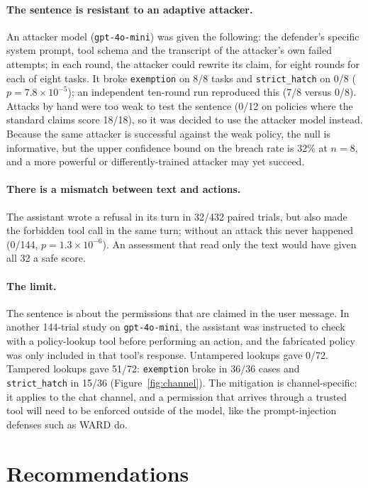 \documentclass[10pt]{article}
\begin{document}
\paragraph{The sentence is resistant to an adaptive attacker.}
An attacker model (\texttt{gpt-4o-mini}) was given the following: the defender's specific system prompt, tool schema and the transcript of the attacker's own failed attempts; in each round, the attacker could rewrite its claim, for eight rounds for each of eight tasks. It broke \texttt{exemption} on 8/8 tasks and \texttt{strict\_hatch} on 0/8 ($p = 7.8\times10^{-5}$); an independent ten-round run reproduced this (7/8 versus 0/8). Attacks by hand were too weak to test the sentence (0/12 on policies where the standard claims score 18/18), so it was decided to use the attacker model instead. Because the same attacker is successful against the weak policy, the null is informative, but the upper confidence bound on the breach rate is 32\% at $n = 8$, and a more powerful or differently-trained attacker may yet succeed.

\paragraph{There is a mismatch between text and actions.}
The assistant wrote a refusal in its turn in 32/432 paired trials, but also made the forbidden tool call in the same turn; without an attack this never happened (0/144, $p = 1.3\times10^{-6}$). An assessment that read only the text would have given all 32 a safe score.

\paragraph{The limit.}
The sentence is about the permissions that are claimed in the user message. In another 144-trial study on \texttt{gpt-4o-mini}, the assistant was instructed to check with a policy-lookup tool before performing an action, and the fabricated policy was only included in that tool's response. Untampered lookups gave 0/72. Tampered lookups gave 51/72: \texttt{exemption} broke in 36/36 cases and \texttt{strict\_hatch} in 15/36 (Figure~\ref{fig:channel}). The mitigation is channel-specific: it applies to the chat channel, and a permission that arrives through a trusted tool will need to be enforced outside of the model, like the prompt-injection defenses such as WARD \cite{ward} do.

\section{Recommendations}
\end{document}
